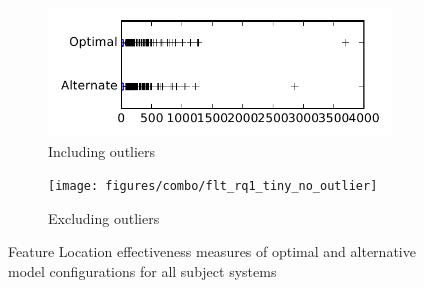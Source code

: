 
\begin{figure}
    \centering
    \begin{subfigure}{.4\textwidth}
        \centering
        \includegraphics[height=0.4\textheight]{figures/combo/flt_rq1_tiny}
        \caption{Including outliers}\label{fig:combo:flt:rq1:tiny_outlier}
    \end{subfigure}%
    \begin{subfigure}{.4\textwidth}
        \centering
        \texttt{[image: figures/combo/flt\_rq1\_tiny\_no\_outlier]}
        \caption{Excluding outliers}\label{fig:combo:flt:rq1:tiny_no_outlier}
    \end{subfigure}
\caption{Feature Location effectiveness measures of optimal and alternative model configurations for all subject systems}
\label{fig:combo:flt:rq1:tiny}
\end{figure}
